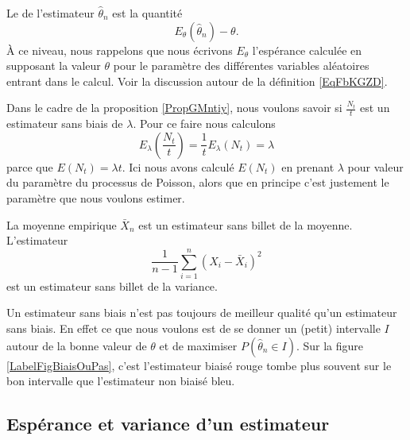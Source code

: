 Le  de l'estimateur \( \hat\theta_n\) est la quantité
\begin{equation}
    E_{\theta}(\hat\theta_n)-\theta.
\end{equation}
À ce niveau, nous rappelons que nous écrivons \( E_{\theta}\) l'espérance calculée en supposant la valeur \( \theta\) pour le paramètre des différentes variables aléatoires entrant dans le calcul. Voir la discussion autour de la définition \eqref{EqFbKGZD}.

\begin{example}     \label{ExytNlTq}
    Dans le cadre de la proposition \ref{PropGMntiy}, nous voulons savoir si \( \frac{ N_t }{ t }\) est un estimateur sans biais de \( \lambda\). Pour ce faire nous calculons
    \begin{equation}
        E_{\lambda}\left( \frac{ N_t }{ t } \right)=\frac{1}{ t }E_{\lambda}(N_t)=\lambda
    \end{equation}
    parce que \( E(N_t)=\lambda t\). Ici nous avons calculé \( E(N_t)\) en prenant \( \lambda\) pour valeur du paramètre du processus de Poisson, alors que en principe c'est justement le paramètre que nous voulons estimer.
\end{example}

\begin{example}
    La moyenne empirique \( \bar X_n\) est un estimateur sans billet de la moyenne. L'estimateur
    \begin{equation}
        \frac{1}{ n-1 }\sum_{i=1}^n(X_i-\bar X_i)^2
    \end{equation}
    est un estimateur sans billet de la variance.
\end{example}

Un estimateur sans biais n'est pas toujours de meilleur qualité qu'un estimateur sans biais. En effet ce que nous voulons est de se donner un (petit) intervalle  \( I\) autour de la bonne valeur de \( \theta\) et de maximiser \( P(\hat\theta_n\in I)\). Sur la figure \ref{LabelFigBiaisOuPas}, c'est l'estimateur biaisé rouge tombe plus souvent sur le bon intervalle que l'estimateur non biaisé bleu.
\newcommand{\CaptionFigBiaisOuPas}{Un estimateur sans biais et un avec biais.}



\subsection{Espérance et variance d'un estimateur}

